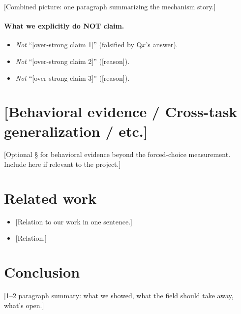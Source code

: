 \documentclass[11pt, letterpaper]{article}
\begin{document}
[Combined picture: one paragraph summarizing the mechanism story.]

\paragraph{What we explicitly do NOT claim.}
\begin{itemize}[leftmargin=*, itemsep=1pt, topsep=2pt]
\item \emph{Not} ``[over-strong claim 1]'' (falsified by Q$x$'s answer).
\item \emph{Not} ``[over-strong claim 2]'' ([reason]).
\item \emph{Not} ``[over-strong claim 3]'' ([reason]).
\end{itemize}

\section{[Behavioral evidence / Cross-task generalization / etc.]}
\label{sec:behavioral}

[Optional § for behavioral evidence beyond the forced-choice measurement.
Include here if relevant to the project.]

\section{Related work}
\label{sec:related}

\begin{itemize}[leftmargin=*, itemsep=3pt, topsep=2pt]
\item \citet{example2024} [Relation to our work in one sentence.]
\item \citet{example2025} [Relation.]
\end{itemize}

\section{Conclusion}

[1--2 paragraph summary: what we showed, what the field should take
away, what's open.]

\FloatBarrier   %
\end{document}
